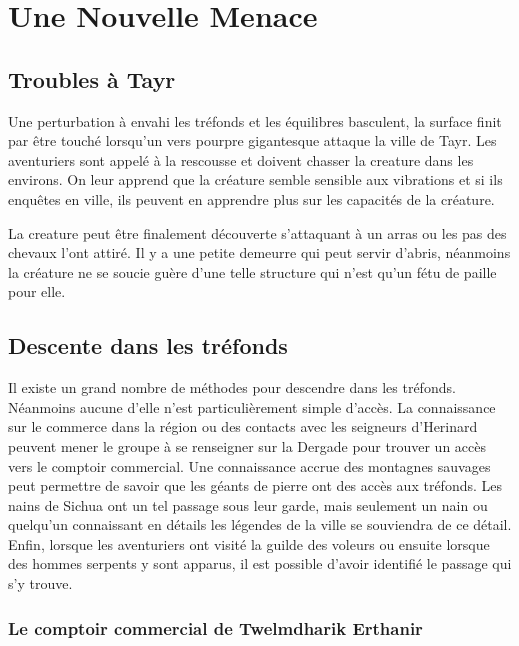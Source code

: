 \section{Une Nouvelle Menace}

\subsection*{Troubles à Tayr}

Une perturbation à envahi les tréfonds et les équilibres basculent, la surface 
finit par être touché lorsqu'un vers pourpre gigantesque attaque la ville de 
Tayr. Les aventuriers sont appelé à la rescousse et doivent chasser la creature 
dans les environs. On leur apprend que la créature semble sensible aux vibrations
et si ils enquêtes en ville, ils peuvent en apprendre plus sur les capacités de 
la créature.

La creature peut être finalement découverte s'attaquant à un arras ou les pas
des chevaux l'ont attiré. Il y a une petite demeurre qui peut servir d'abris,
néanmoins la créature ne se soucie guère d'une telle structure qui n'est qu'un 
fétu de paille pour elle. 

\subsection*{Descente dans les tréfonds}

Il existe un grand nombre de méthodes pour descendre dans les tréfonds. Néanmoins
aucune d'elle n'est particulièrement simple d'accès. La connaissance sur le commerce
dans la région ou des contacts avec les seigneurs d'Herinard peuvent mener le groupe 
à se renseigner sur la Dergade pour trouver un accès vers le comptoir commercial. Une
connaissance accrue des montagnes sauvages peut permettre de savoir que les géants de 
pierre ont des accès aux tréfonds. Les nains de Sichua ont un tel passage sous leur 
garde, mais seulement un nain ou quelqu'un connaissant en détails les légendes de la 
ville se souviendra de ce détail. Enfin, lorsque les aventuriers ont visité la guilde des
voleurs ou ensuite lorsque des hommes serpents y sont apparus, il est possible d'avoir 
identifié le passage qui s'y trouve.


\subsubsection*{Le comptoir commercial de Twelmdharik Erthanir}

